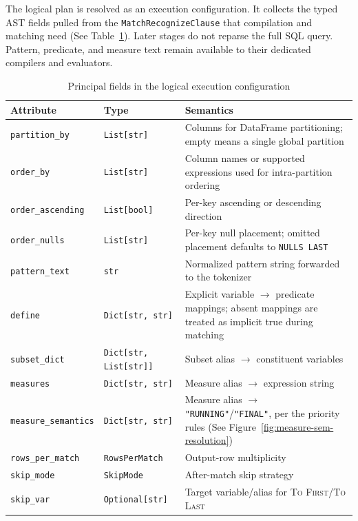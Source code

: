 The logical plan is resolved as an execution configuration.  It collects
the typed AST fields pulled from the \texttt{MatchRecognizeClause} that compilation and matching need
(See Table~\ref{tab:logical-plan}).  Later stages do not reparse the full
SQL query.  Pattern, predicate, and measure text remain available to
their dedicated compilers and evaluators.

\begin{table}[htbp]
  \centering
  \caption{Principal fields in the logical execution configuration}
  \label{tab:logical-plan}
  \small
  \setlength{\tabcolsep}{4pt}
  \begin{tabular}{llp{6.2cm}}
    \toprule
    \textbf{Attribute} & \textbf{Type} & \textbf{Semantics} \\
    \midrule
    \texttt{partition\_by}   & \texttt{List[str]}
      & Columns for DataFrame partitioning; empty means a single
        global partition \\[4pt]
    \texttt{order\_by}       & \texttt{List[str]}
      & Column names or supported expressions used for
        intra-partition ordering \\[4pt]
    \texttt{order\_ascending} & \texttt{List[bool]}
      & Per-key ascending or descending direction \\[4pt]
    \texttt{order\_nulls}   & \texttt{List[str]}
      & Per-key null placement; omitted placement defaults to
        \texttt{NULLS LAST} \\[4pt]
    \texttt{pattern\_text}   & \texttt{str}
      & Normalized pattern string forwarded to the tokenizer \\[4pt]
    \texttt{define}          & \texttt{Dict[str, str]}
      & Explicit variable $\to$ predicate mappings; absent mappings are
        treated as implicit true during matching \\[4pt]
    \texttt{subset\_dict}    & \texttt{Dict[str, List[str]]}
      & Subset alias $\to$ constituent variables \\[4pt]
    \texttt{measures}        & \texttt{Dict[str, str]}
      & Measure alias $\to$ expression string \\[4pt]
    \texttt{measure\_semantics} & \texttt{Dict[str, str]}
      & Measure alias $\to$ \texttt{"RUNNING"}/\texttt{"FINAL"}, per the priority rules (See Figure~\ref{fig:measure-sem-resolution}) \\[4pt]
    \texttt{rows\_per\_match} & \texttt{RowsPerMatch}
      & Output-row multiplicity \\[4pt]
    \texttt{skip\_mode}      & \texttt{SkipMode}
      & After-match skip strategy \\[4pt]
    \texttt{skip\_var}       & \texttt{Optional[str]}
      & Target variable/alias for \textsc{To First}/\textsc{To Last} \\
    \bottomrule
  \end{tabular}
\end{table}

